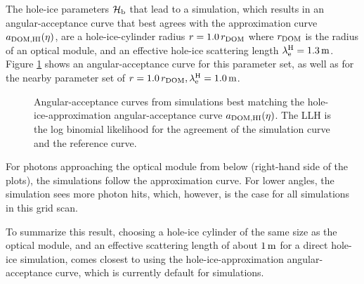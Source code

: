 The hole-ice parameters \({\mathcal{H}_\text{b}}\) that lead to a simulation, which
results in an angular-acceptance curve that best agrees with the
approximation curve \(a_\text{DOM,HI}(\eta)\), are a hole-ice-cylinder radius
\(r = 1.0\,r_\text{DOM}\) where \(r_\text{DOM}\) is the radius of an optical module,
and an effective hole-ice scattering length \(\lambda_\text{e}^\text{H} = 1.3\text{\,m}\).
Figure \ref{fig:weShir8i} shows an angular-acceptance curve for this
parameter set, as well as for the nearby parameter set of
\(r=1.0\,r_\text{DOM}, \lambda_\text{e}^\text{H} = 1.0\text{\,m}\).

\begin{figure}[htbp]
  \hfill
  \caption{Angular-acceptance curves from simulations best matching the hole-ice-approximation angular-acceptance curve $a_\text{DOM,HI}(\eta)$. The LLH is the log binomial likelihood for the agreement of the simulation curve and the reference curve.}
  \label{fig:weShir8i}
\end{figure}

For photons approaching the optical module from below (right-hand side
of the plots), the simulations follow the approximation curve. For lower
angles, the simulation sees more photon hits, which, however, is the
case for all simulations in this grid scan.

To summarize this result, choosing a hole-ice cylinder of the same size
as the optical module, and an effective scattering length of about
\(1\text{\,m}\) for a direct hole-ice simulation, comes closest to using the
hole-ice-approximation angular-acceptance curve, which is currently
default for \clsim simulations.
